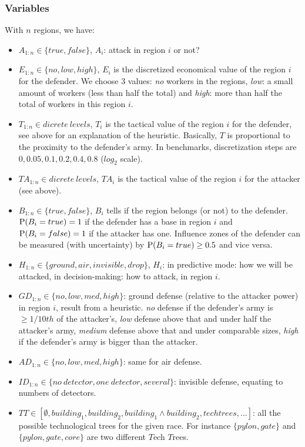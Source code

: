 \subsubsection{Variables}
With $n$ regions, we have: 
\begin{itemize}
    \item $A_{1:n} \in \{true,false\}$, $A_i$: attack in region $i$ or not?
    \item $E_{1:n} \in \{no, low, high\}$, $E_i$ is the discretized economical value of the region $i$ for the defender. We choose 3 values: \textit{no} workers in the regions, \textit{low}: a small amount of workers (less than half the total) and \textit{high}: more than half the total of workers in this region $i$.
    \item $T_{1:n} \in dicrete\ levels$, $T_i$ is the tactical value of the region $i$ for the defender, see above for an explanation of the heuristic. Basically, $T$ is proportional to the proximity to the defender's army. In benchmarks, discretization steps are $0,0.05,0.1,0.2,0.4,0.8$ ($log_2$ scale).
    \item $TA_{1:n} \in dicrete\ levels$, $TA_i$ is the tactical value of the region $i$ for the attacker (see above).
    \item $B_{1:n} \in \{true, false\}$, $B_i$ tells if the region belongs (or not) to the defender. $\mathrm{P}(B_i=true)=1$ if the defender has a base in region $i$ and $\mathrm{P}(B_i=false)=1$ if the attacker has one. Influence zones of the defender can be measured (with uncertainty) by $\mathrm{P}(B_i=true) \geq 0.5$ and vice versa.
    \item $H_{1:n} \in \{ground, air, invisible, drop\}$, $H_i$: in predictive mode: how we will be attacked, in decision-making: how to attack, in region $i$.
    \item $GD_{1:n} \in \{no, low, med, high\}$: ground defense (relative to the attacker power) in region $i$, result from a heuristic. \textit{no} defense if the defender's army is $\geq 1/10th$ of the attacker's, \textit{low} defense above that and under half the attacker's army, \textit{medium} defense above that and under comparable sizes, \textit{high} if the defender's army is bigger than the attacker.
    \item $AD_{1:n} \in \{no, low, med, high\}$: same for air defense.
    \item $ID_{1:n} \in \{no\ detector, one\ detector, several\}$: invisible defense, equating to numbers of detectors.
    \item $TT \in [\emptyset, building_1, building_2, building_1\wedge building_2, techtrees, \dots]$: all the possible technological trees for the given race. For instance $\{pylon, gate\}$ and $\{pylon, gate, core\}$ are two different $T$ech $T$rees.

\end{itemize}
